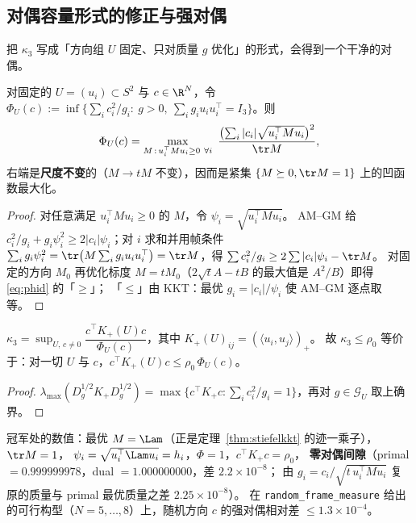 \subsection{对偶容量形式的修正与强对偶}\label{sec:r17:dual}

把 $\kappa_3$ 写成「方向组 $U$ 固定、只对质量 $g$ 优化」的形式，会得到一个干净的对偶。

\begin{lemma}[对偶容量]\label{lem:phid}
对固定的 $U=(u_i)\subset S^2$ 与 $c\in\R^N$，令
$\Phi_U(c):=\inf\bigl\{\sum_ic_i^2/g_i:\ g>0,\ \sum_ig_iu_iu_i^\top=I_3\bigr\}$。则
\begin{equation}\label{eq:phid}
\Phi_U(c)=\max_{M\,:\,u_i^\top Mu_i\ge0\ \forall i}\ \frac{\bigl(\sum_i|c_i|\sqrt{u_i^\top Mu_i}\bigr)^2}{\tr M},
\end{equation}
右端是\textbf{尺度不变}的（$M\to tM$ 不变），因而是紧集 $\{M\succeq0,\tr M=1\}$ 上的凹函数最大化。
\end{lemma}

\begin{proof}
对任意满足 $u_i^\top Mu_i\ge0$ 的 $M$，令 $\psi_i=\sqrt{u_i^\top Mu_i}$。
AM--GM 给 $c_i^2/g_i+g_i\psi_i^2\ge2|c_i|\psi_i$；对 $i$ 求和并用帧条件
$\sum_ig_i\psi_i^2=\tr\bigl(M\sum_ig_iu_iu_i^\top\bigr)=\tr M$，得
$\sum c_i^2/g_i\ge2\sum|c_i|\psi_i-\tr M$。
对固定的方向 $M_0$ 再优化标度 $M=tM_0$（$2\sqrt tA-tB$ 的最大值是 $A^2/B$）即得 \eqref{eq:phid} 的「$\ge$」；
「$\le$」由 KKT：最优 $g_i=|c_i|/\psi_i$ 使 AM--GM 逐点取等。
\end{proof}

\begin{corollary}\label{cor:phikappa}
$\kappa_3=\sup_{U,\,c\ne0}\dfrac{c^\top K_+(U)c}{\Phi_U(c)}$，其中 $K_+(U)_{ij}=(\langle u_i,u_j\rangle)_+$。
故 $\kappa_3\le\rho_0$ 等价于：对一切 $U$ 与 $c$，$c^\top K_+(U)c\le\rho_0\,\Phi_U(c)$。
\end{corollary}

\begin{proof}
$\lambda_{\max}(D_g^{1/2}K_+D_g^{1/2})=\max\{c^\top K_+c:\sum_ic_i^2/g_i=1\}$，再对 $g\in\mathcal G_U$ 取上确界。
\end{proof}

冠军处的数值：最优 $M=\Lam$（正是定理~\ref{thm:stiefelkkt} 的迹一乘子），$\tr M=1$，
$\psi_i=\sqrt{u_i^\top\Lam u_i}=h_i$，$\Phi=1$，$c^\top K_+c=\rho_0$，
\textbf{零对偶间隙}（primal $=0.999999978$，dual $=1.000000000$，差 $2.2\times10^{-8}$；
由 $g_i=c_i/\sqrt{t\,u_i^\top Mu_i}$ 复原的质量与 primal 最优质量之差 $2.25\times10^{-8}$）。
在 \texttt{random\_frame\_measure} 给出的可行构型（$N=5,\dots,8$）上，随机方向 $c$ 的强对偶相对差 $\le1.3\times10^{-4}$。

